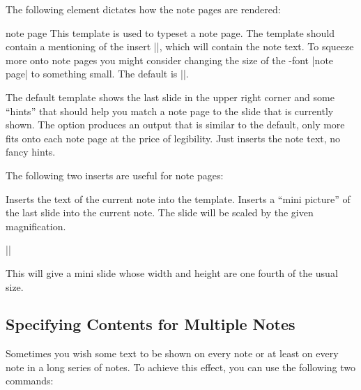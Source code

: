 The following element dictates how the note pages are rendered:

\begin{element}{note page}\yes\yes\yes
  This template is used to typeset a note page.  The template should contain a mentioning of the insert |\insertnote|, which will contain the note text. To squeeze more onto note pages you might consider changing the size of the \beamer-font |note page| to something small. The default is |\small|.
  \begin{templateoptions}
    The default template shows the last slide in the upper right corner and some ``hints'' that should help you match a note page to the slide that is currently shown.
    The option produces an output that is similar to the default, only more fits onto each note page at the price of legibility.
    Just inserts the note text, no fancy hints.
  \end{templateoptions}
  The following two inserts are useful for note pages:
  \begin{itemize}
    \iteminsert{\insertnote}
    Inserts the text of the current note into the template.
    \iteminsert{\insertslideintonotes}
    Inserts a ``mini picture'' of the last slide into the current note. The slide will be scaled by the given magnification.

    \example
    ||

    This will give a mini slide whose width and height are one fourth of the usual size.
  \end{itemize}
\end{element}


\subsection{Specifying Contents for Multiple Notes}

Sometimes you wish some text to be shown on every note or at least on every note in a long series of notes. To achieve this effect, you can use the following two commands:

